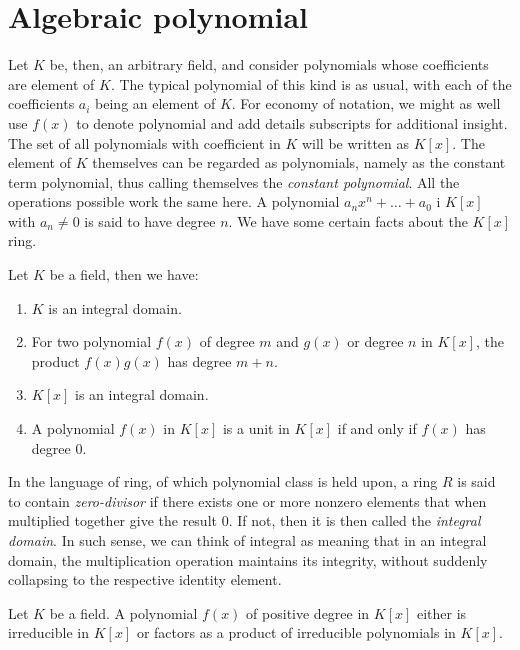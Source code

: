 \section{Algebraic polynomial}

Let $K$ be, then, an arbitrary field, and consider polynomials whose coefficients are element of $K$. The typical polynomial of this kind is as usual, with each of the coefficients $a_{i}$ being an element of $K$. For economy of notation, we might as well use $f(x)$ to denote polynomial and add details subscripts for additional insight. The set of all polynomials with coefficient in $K$ will be written as $K[x]$. The element of $K$ themselves can be regarded as polynomials, namely as the constant term polynomial, thus calling themselves the \textit{constant polynomial}. All the operations possible work the same here. A polynomial $a_{n}x^{n}+\dots+a_{0}$ i $K[x]$ with $a_{n}\neq 0$ is said to have degree $n$. We have some certain facts about the $K[x]$ ring. 

\begin{theorem}
    Let $K$ be a field, then we have:
    \begin{enumerate}[leftmargin=2cm,topsep=1pt,itemsep=1pt]
        \item $K$ is an integral domain. 
        \item For two polynomial $f(x)$ of degree $m$ and $g(x)$ or degree $n$ in $K[x]$, the product $f(x)g(x)$ has degree $m+n$. 
        \item $K[x]$ is an integral domain. 
        \item A polynomial $f(x)$ in $K[x]$ is a unit in $K[x]$ if and only if $f(x)$ has degree $0$. 
    \end{enumerate}
\end{theorem}

In the language of ring, of which polynomial class is held upon, a ring $R$ is said to contain \textit{zero-divisor} if there exists one or more nonzero elements that when multiplied together give the result $0$. If not, then it is then called the \textit{integral domain}. In such sense, we can think of integral as meaning that in an integral domain, the multiplication operation maintains its integrity, without suddenly collapsing to the respective identity element. 

\begin{theorem}
    Let $K$ be a field. A polynomial $f(x)$ of positive degree in $K[x]$ either is irreducible in $K[x]$ or factors as a product of irreducible polynomials in $K[x]$. 
\end{theorem}

